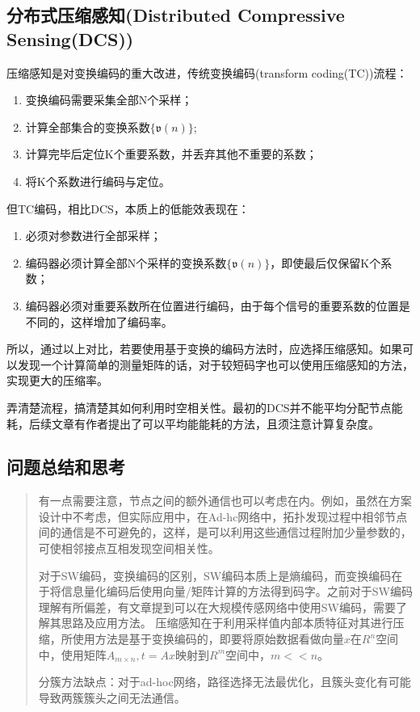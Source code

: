 \subsection{分布式压缩感知(Distributed Compressive Sensing(DCS))}
压缩感知是对变换编码的重大改进，传统变换编码(transform coding(TC))流程：
\begin{enumerate}
    \item 变换编码需要采集全部N个采样；
    \item 计算全部集合的变换系数$\{\mathfrak{v}(n)\}$;
    \item 计算完毕后定位K个重要系数，并丢弃其他不重要的系数；
    \item 将K个系数进行编码与定位。
\end{enumerate}
但TC编码，相比DCS，本质上的低能效表现在：
\begin{enumerate}
    \item 必须对参数进行全部采样；
    \item 编码器必须计算全部N个采样的变换系数$\{\mathfrak{v}(n)\}$，即使最后仅保留K个系数；
    \item 编码器必须对重要系数所在位置进行编码，由于每个信号的重要系数的位置是不同的，这样增加了编码率。
\end{enumerate}

所以，通过以上对比，若要使用基于变换的编码方法时，应选择压缩感知。如果可以发现一个计算简单的测量矩阵的话，对于较短码字也可以使用压缩感知的方法，实现更大的压缩率。

弄清楚流程，搞清楚其如何利用时空相关性。最初的DCS并不能平均分配节点能耗，后续文章有作者提出了可以平均能能耗的方法，且须注意计算复杂度。

\subsection{问题总结和思考}
\begin{quote}	
	有一点需要注意，节点之间的额外通信也可以考虑在内。例如，虽然在方案设计中不考虑，但实际应用中，在Ad-hc网络中，拓扑发现过程中相邻节点间的通信是不可避免的，这样，是可以利用这些通信过程附加少量参数的，可使相邻接点互相发现空间相关性。
	
	对于SW编码，变换编码的区别，SW编码本质上是熵编码，而变换编码在于将信息量化编码后使用向量/矩阵计算的方法得到码字。\textcolor[rgb]{1,0,0}{之前对于SW编码理解有所偏差，有文章提到可以在大规模传感网络中使用SW编码，需要了解其思路及应用方法}。
	压缩感知在于利用采样值内部本质特征对其进行压缩，所使用方法是基于变换编码的，即要将原始数据看做向量$x$在$R^n$空间中，使用矩阵$A_{m\times n}, t=Ax$映射到$R^m$空间中，$m<<n$。
	
	
	分簇方法缺点：对于ad-hoc网络，路径选择无法最优化，且簇头变化有可能导致两簇簇头之间无法通信。
	
\end{quote}
